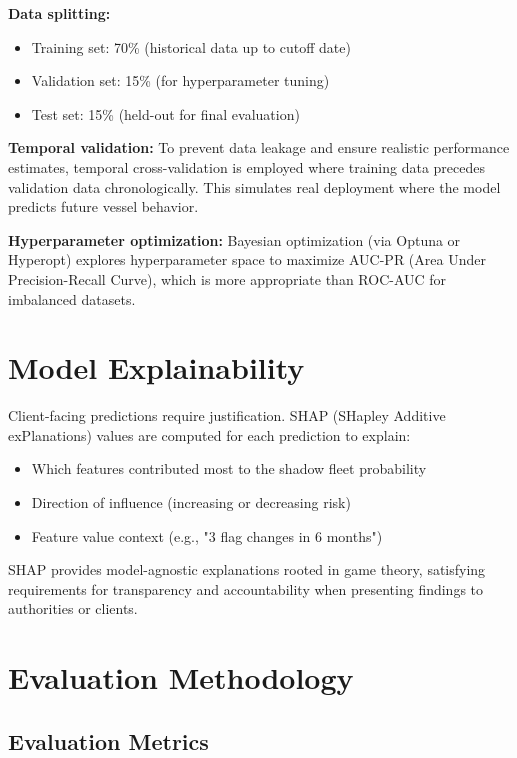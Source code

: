\textbf{Data splitting:}
\begin{itemize}
    \item Training set: 70\% (historical data up to cutoff date)
    \item Validation set: 15\% (for hyperparameter tuning)
    \item Test set: 15\% (held-out for final evaluation)
\end{itemize}

\textbf{Temporal validation:}
To prevent data leakage and ensure realistic performance estimates, temporal cross-validation is employed where training data precedes validation data chronologically. This simulates real deployment where the model predicts future vessel behavior.

\textbf{Hyperparameter optimization:}
Bayesian optimization (via Optuna or Hyperopt) explores hyperparameter space to maximize AUC-PR (Area Under Precision-Recall Curve), which is more appropriate than ROC-AUC for imbalanced datasets.

\section{Model Explainability}

Client-facing predictions require justification. SHAP (SHapley Additive exPlanations) values are computed for each prediction to explain:
\begin{itemize}
    \item Which features contributed most to the shadow fleet probability
    \item Direction of influence (increasing or decreasing risk)
    \item Feature value context (e.g., "3 flag changes in 6 months")
\end{itemize}

SHAP provides model-agnostic explanations rooted in game theory, satisfying requirements for transparency and accountability when presenting findings to authorities or clients.

\section{Evaluation Methodology}

\subsection{Evaluation Metrics}

